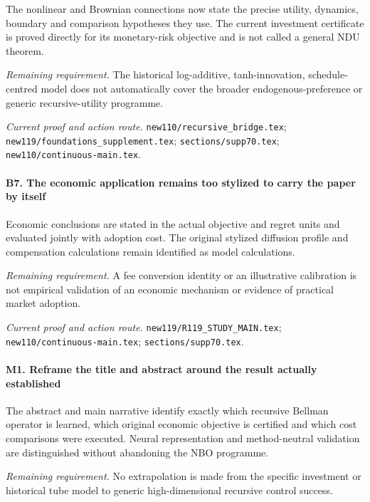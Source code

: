 The nonlinear and Brownian connections now state the precise utility, dynamics, boundary and comparison hypotheses they use. The current investment certificate is proved directly for its monetary-risk objective and is not called a general NDU theorem.

\par\emph{Remaining requirement.} The historical log-additive, tanh-innovation, schedule-centred model does not automatically cover the broader endogenous-preference or generic recursive-utility programme.

\par\emph{Current proof and action route.} \nolinkurl{new110/recursive_bridge.tex}; \nolinkurl{new119/foundations_supplement.tex}; \nolinkurl{sections/supp70.tex}; \nolinkurl{new110/continuous-main.tex}.

\paragraph{B7. The economic application remains too stylized to carry the paper by itself}

Economic conclusions are stated in the actual objective and regret units and evaluated jointly with adoption cost. The original stylized diffusion profile and compensation calculations remain identified as model calculations.

\par\emph{Remaining requirement.} A fee conversion identity or an illustrative calibration is not empirical validation of an economic mechanism or evidence of practical market adoption.

\par\emph{Current proof and action route.} \nolinkurl{new119/R119_STUDY_MAIN.tex}; \nolinkurl{new110/continuous-main.tex}; \nolinkurl{sections/supp70.tex}.

\paragraph{M1. Reframe the title and abstract around the result actually established}

The abstract and main narrative identify exactly which recursive Bellman operator is learned, which original economic objective is certified and which cost comparisons were executed. Neural representation and method-neutral validation are distinguished without abandoning the NBO programme.

\par\emph{Remaining requirement.} No extrapolation is made from the specific investment or historical tube model to generic high-dimensional recursive control success.

